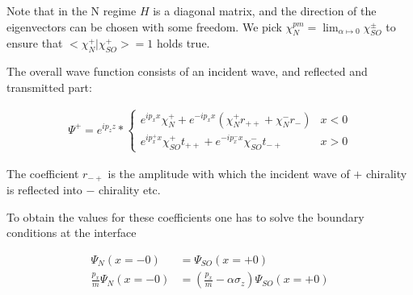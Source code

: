 \documentclass[11pt]{article}
\begin{document}
Note that in the N regime $H$ is a diagonal matrix, and the direction
of the eigenvectors can be chosen with some freedom. We pick
$\chi_N^{pm} = \lim_{\alpha \mapsto 0} \chi_{SO}^{\pm}$ to ensure that
$<\chi_N^+|\chi_{SO}^+> = 1$ holds true.

The overall wave function consists of an incident wave, and reflected
and transmitted part:

\begin{align}
    \Psi^+ = e^{i p_z z} * \left\{
        \begin{array}{ll}
            e^{i p_x x} \chi_N^+ + e^{- i p_x x} (\chi_N^+ r_{++} +
                    \chi_N^- r_{-})     & x < 0\\
            e^{i p_x^+ x} \chi_{SO}^+ t_{++} + e^{-i p_x^- x}
            \chi_{SO}^- t_{-+}          & x > 0
        \end{array} \right.
\end{align}

The coefficient $r_{-+}$ is the amplitude with which the incident wave
of $+$ chirality is reflected into $-$ chirality etc.

To obtain the values for these coefficients one has to solve the
boundary conditions at the interface

\begin{align}
    \Psi_N(x = -0)              &= \Psi_{SO}(x = +0)\\
    \frac{p_x}{m} \Psi_N(x = -0)&= \left(\frac{p_x}{m} -\alpha \sigma_z\right)
                                        \Psi_{SO}(x = +0)
\end{align}
\end{document}
